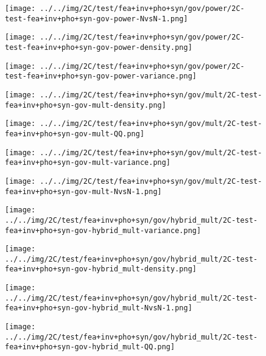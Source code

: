 \begin{figure}[H]
\centering	\texttt{[image: ../../img/2C/test/fea+inv+pho+syn/gov/power/2C-test-fea+inv+pho+syn-gov-power-NvsN-1.png]}
\end{figure}
\begin{figure}[H]
\centering	\texttt{[image: ../../img/2C/test/fea+inv+pho+syn/gov/power/2C-test-fea+inv+pho+syn-gov-power-density.png]}
\end{figure}
\begin{figure}[H]
\centering	\texttt{[image: ../../img/2C/test/fea+inv+pho+syn/gov/power/2C-test-fea+inv+pho+syn-gov-power-variance.png]}
\end{figure}
\begin{figure}[H]
\centering	\texttt{[image: ../../img/2C/test/fea+inv+pho+syn/gov/mult/2C-test-fea+inv+pho+syn-gov-mult-density.png]}
\end{figure}
\begin{figure}[H]
\centering	\texttt{[image: ../../img/2C/test/fea+inv+pho+syn/gov/mult/2C-test-fea+inv+pho+syn-gov-mult-QQ.png]}
\end{figure}
\begin{figure}[H]
\centering	\texttt{[image: ../../img/2C/test/fea+inv+pho+syn/gov/mult/2C-test-fea+inv+pho+syn-gov-mult-variance.png]}
\end{figure}
\begin{figure}[H]
\centering	\texttt{[image: ../../img/2C/test/fea+inv+pho+syn/gov/mult/2C-test-fea+inv+pho+syn-gov-mult-NvsN-1.png]}
\end{figure}
\begin{figure}[H]
\centering	\texttt{[image: ../../img/2C/test/fea+inv+pho+syn/gov/hybrid\_mult/2C-test-fea+inv+pho+syn-gov-hybrid\_mult-variance.png]}
\end{figure}
\begin{figure}[H]
\centering	\texttt{[image: ../../img/2C/test/fea+inv+pho+syn/gov/hybrid\_mult/2C-test-fea+inv+pho+syn-gov-hybrid\_mult-density.png]}
\end{figure}
\begin{figure}[H]
\centering	\texttt{[image: ../../img/2C/test/fea+inv+pho+syn/gov/hybrid\_mult/2C-test-fea+inv+pho+syn-gov-hybrid\_mult-NvsN-1.png]}
\end{figure}
\begin{figure}[H]
\centering	\texttt{[image: ../../img/2C/test/fea+inv+pho+syn/gov/hybrid\_mult/2C-test-fea+inv+pho+syn-gov-hybrid\_mult-QQ.png]}
\end{figure}
